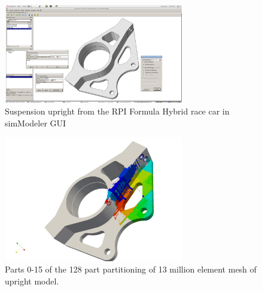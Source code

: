 \documentclass{article}
\begin{document}
\begin{figure}[h!]
  \centering
    \includegraphics[width=0.7\textwidth]{albany1}
  \caption{Suspension upright from the RPI Formula Hybrid race car in simModeler GUI}
\end{figure}
\begin{figure}[h!]
  \centering
    \includegraphics[width=0.7\textwidth]{albany2}
  \caption{Parts 0-15 of the 128 part partitioning of 13 million element mesh of upright model.}
\end{figure}
\end{document}
